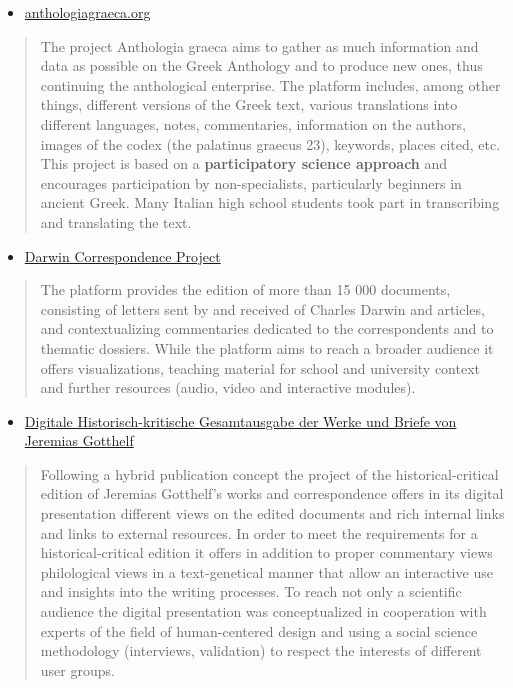 \documentclass[
  letterpaper,
  DIV=11,
  numbers=noendperiod]{scrreprt}
\providecommand{\tightlist}{%
  \setlength{\itemsep}{0pt}\setlength{\parskip}{0pt}}\usepackage{longtable,booktabs,array}
\begin{document}
\begin{itemize}
\tightlist
\item
  \href{https://anthologiagraeca.org/}{anthologiagraeca.org}
\end{itemize}

\begin{quote}
The project Anthologia graeca aims to gather as much information and
data as possible on the Greek Anthology and to produce new ones, thus
continuing the anthological enterprise. The platform includes, among
other things, different versions of the Greek text, various translations
into different languages, notes, commentaries, information on the
authors, images of the codex (the palatinus graecus 23), keywords,
places cited, etc. This project is based on a \textbf{participatory
science approach} and encourages participation by non-specialists,
particularly beginners in ancient Greek. Many Italian high school
students took part in transcribing and translating the text.
\end{quote}

\begin{itemize}
\tightlist
\item
  \href{https://www.darwinproject.ac.uk/}{Darwin Correspondence Project}
\end{itemize}

\begin{quote}
The platform provides the edition of more than 15 000 documents,
consisting of letters sent by and received of Charles Darwin and
articles, and contextualizing commentaries dedicated to the
correspondents and to thematic dossiers. While the platform aims to
reach a broader audience it offers visualizations, teaching material for
school and university context and further resources (audio, video and
interactive modules).
\end{quote}

\begin{itemize}
\tightlist
\item
  \href{https://gotthelf-digital.ch/}{Digitale Historisch-kritische
  Gesamtausgabe der Werke und Briefe von Jeremias Gotthelf}
\end{itemize}

\begin{quote}
Following a hybrid publication concept the project of the
historical-critical edition of Jeremias Gotthelf's works and
correspondence offers in its digital presentation different views on the
edited documents and rich internal links and links to external
resources. In order to meet the requirements for a historical-critical
edition it offers in addition to proper commentary views philological
views in a text-genetical manner that allow an interactive use and
insights into the writing processes. To reach not only a scientific
audience the digital presentation was conceptualized in cooperation with
experts of the field of human-centered design and using a social science
methodology (interviews, validation) to respect the interests of
different user groups.
\end{quote}
\end{document}
